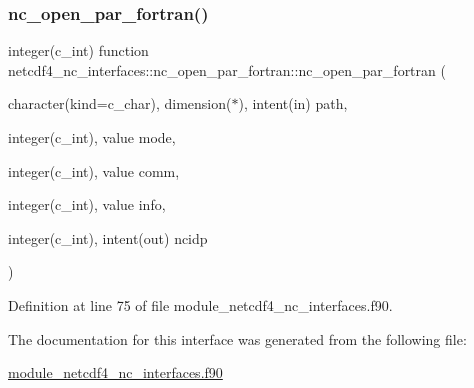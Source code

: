 \subsubsection{\texorpdfstring{nc\+\_\+open\+\_\+par\+\_\+fortran()}{nc\_open\_par\_fortran()}}
{\footnotesize\ttfamily integer(c\+\_\+int) function netcdf4\+\_\+nc\+\_\+interfaces\+::nc\+\_\+open\+\_\+par\+\_\+fortran\+::nc\+\_\+open\+\_\+par\+\_\+fortran (\begin{DoxyParamCaption}\item[{character(kind=c\+\_\+char), dimension($\ast$), intent(in)}]{path,  }\item[{integer(c\+\_\+int), value}]{mode,  }\item[{integer(c\+\_\+int), value}]{comm,  }\item[{integer(c\+\_\+int), value}]{info,  }\item[{integer(c\+\_\+int), intent(out)}]{ncidp }\end{DoxyParamCaption})}



Definition at line 75 of file module\+\_\+netcdf4\+\_\+nc\+\_\+interfaces.\+f90.



The documentation for this interface was generated from the following file\+:\begin{DoxyCompactItemize}
\item 
\hyperlink{module__netcdf4__nc__interfaces_8f90}{module\+\_\+netcdf4\+\_\+nc\+\_\+interfaces.\+f90}\end{DoxyCompactItemize}
